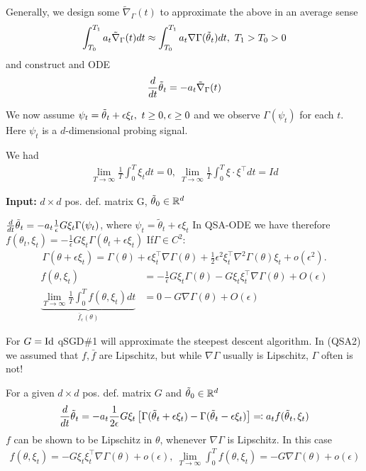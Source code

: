 Generally, we design some \(\tilde{\nabla}_\Gamma(t)\) to approximate the above in an average sense
\[\int_{T_0}^{T_1}a_t\tilde{\nabla}_\Gamma(t)dt \approx \int_{T_0}^{T_1}a_t \nabla\Gamma(\thetatilde_t)dt,\ T_1>T_0>0\]
and construct and ODE 
\begin{equation}
    \frac{d}{dt}{\tilde{\theta}}_t=-a_t\tilde{\nabla}_\Gamma(t)
\end{equation}

We now assume \(\psi_t={\tilde{\theta}}_t+\epsilon \xi_t,\ t\geq 0,\epsilon\geq 0\)
and we observe \(\Gamma(\psi_t)\) for each \(t\). Here \(\psi_t\) is a \(d\)-dimensional probing signal.

We had \begin{align*}
    \lim_{T\to\infty}\frac{1}{T}\int_0^T \xi_t dt=0,\ \lim_{T\to\infty}\frac{1}{T}\int_0^T \xi\cdot \xi^\intercal dt=Id
\end{align*}

\textbf{Input:} \(d\times d\) pos. def. matrix G, \({\tilde{\theta}}_0\in \mathbb{R}^d\)

\(\frac{d}{dt}{\tilde{\theta}}_t=-a_t\frac{1}{\epsilon}G\xi_t\Gamma(\psi_t)\), where \(\psi_t=\tilde{\theta}_t+\epsilon\xi_t\)
In QSA-ODE 
we have therefore \(f(\theta_t,\xi_t)=-\frac{1}{\epsilon}G\xi_t\Gamma(\theta_t+\epsilon\xi_t)\)
If\(\Gamma\in C^2\):
\begin{align*}
    \Gamma(\theta+\epsilon\xi_t)=\Gamma(\theta)+\epsilon\xi_t^\intercal \nabla\Gamma(\theta)+\frac{1}{2}\epsilon^2\xi_t^\intercal\nabla^2 \Gamma(\theta)\xi_t+o(\epsilon^2).
\end{align*}
\begin{align*}
    f(\theta,\xi_t)&=-\frac{1}{\epsilon}G\xi_t\Gamma(\theta)-G \xi_t\xi_t^\intercal\nabla\Gamma(\theta)+O(\epsilon)\\
    \underbrace{\lim_{T\to\infty}\frac{1}{T}\int_0^Tf(\theta,\xi_t)dt}_{\bar{f}_\epsilon(\theta)}&=0-G\nabla\Gamma(\theta)+O(\epsilon) 
\end{align*}


For \(G=\text{Id}\) qSGD\#1 will approximate the steepest descent algorithm. In (QSA2) we assumed that 
\(f, \bar{f}\) are Lipschitz, but while \(\nabla\Gamma\) usually is Lipschitz, \(\Gamma\) often is not!


For a given \(d\times d\) pos. def. matrix \(G\) and \({\tilde{\theta}}_0\in\mathbb{R}^d\)
\begin{align*}
    \frac{d}{dt}{\tilde{\theta}}_t=-a_t\frac{1}{2\epsilon} G\xi_t\left[\Gamma({\tilde{\theta}}_{t}+\epsilon\xi_t)-\Gamma({\tilde{\theta}}_t-\epsilon\xi_t)\right]\eqcolon a_t f({\tilde{\theta}}_t,\xi_t)
\end{align*}
\(f\) can be shown to be Lipschitz in \(\theta\), whenever \(\nabla\Gamma\) is Lipschitz. 
In this case 
\begin{align*}
    f(\theta,\xi_t)=-G \xi_t\xi_t^\intercal\nabla\Gamma(\theta)+o(\epsilon),\ \lim_{T\to\infty} \int_0^T f(\theta,\xi_t)=-G\nabla\Gamma(\theta)+o(\epsilon)
\end{align*} 


